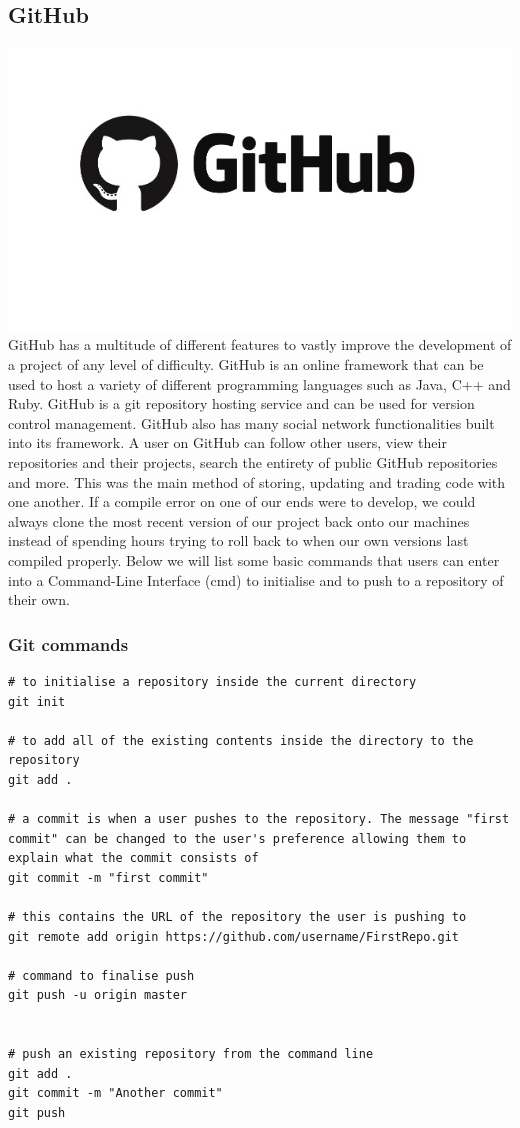 \subsection{GitHub}
\includegraphics[scale=0.7]{img/github-logo.jpg}
GitHub has a multitude of different features to vastly improve the development of a project of any level of difficulty. GitHub is an online framework that can be used to host a variety of different programming languages such as Java, C++ and Ruby. GitHub is a git repository hosting service and can be used for version control management. \newline
GitHub also has many social network functionalities built into its framework. A user on GitHub can follow other users, view their repositories and their projects, search the entirety of public GitHub repositories and more. This was the main method of storing, updating and trading code with one another. If a compile error on one of our ends were to develop, we could always clone the most recent version of our project back onto our machines instead of spending hours trying to roll back to when our own versions last compiled properly. \newline
Below we will list some basic commands that users can enter into a Command-Line Interface (cmd) to initialise and to push to a repository of their own.
\subsubsection{Git commands}
\begin{verbatim}
# to initialise a repository inside the current directory
git init

# to add all of the existing contents inside the directory to the repository
git add .

# a commit is when a user pushes to the repository. The message "first commit" can be changed to the user's preference allowing them to explain what the commit consists of
git commit -m "first commit"

# this contains the URL of the repository the user is pushing to
git remote add origin https://github.com/username/FirstRepo.git 

# command to finalise push
git push -u origin master


# push an existing repository from the command line
git add .
git commit -m "Another commit"
git push

\end{verbatim}

